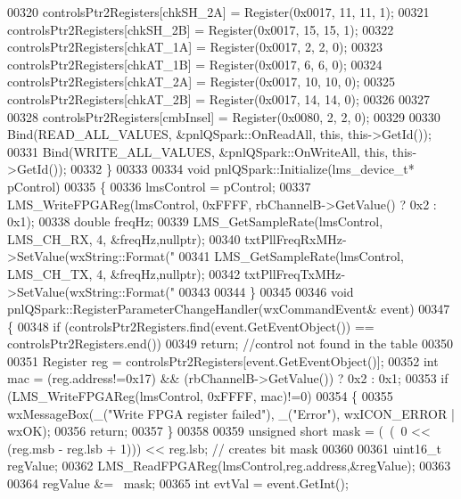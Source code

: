\begin{DoxyCode}
00320     controlsPtr2Registers[chkSH_2A] = Register(0x0017, 11, 11, 1);
00321     controlsPtr2Registers[chkSH_2B] = Register(0x0017, 15, 15, 1);
00322     controlsPtr2Registers[chkAT_1A] = Register(0x0017, 2, 2, 0);
00323     controlsPtr2Registers[chkAT_1B] = Register(0x0017, 6, 6, 0);
00324     controlsPtr2Registers[chkAT_2A] = Register(0x0017, 10, 10, 0);
00325     controlsPtr2Registers[chkAT_2B] = Register(0x0017, 14, 14, 0);
00326 
00327 
00328     controlsPtr2Registers[cmbInsel] = Register(0x0080, 2, 2, 0);
00329     
00330     Bind(READ\_ALL\_VALUES, &pnlQSpark::OnReadAll, \textcolor{keyword}{this}, this->GetId());
00331     Bind(WRITE\_ALL\_VALUES, &pnlQSpark::OnWriteAll, \textcolor{keyword}{this}, this->GetId());
00332 \}
00333 
00334 \textcolor{keywordtype}{void} pnlQSpark::Initialize(lms_device_t* pControl)
00335 \{
00336     lmsControl = pControl;
00337     LMS_WriteFPGAReg(lmsControl, 0xFFFF, rbChannelB->GetValue() ? 0x2 : 0x1);
00338     \textcolor{keywordtype}{double} freqHz;
00339     LMS_GetSampleRate(lmsControl, LMS_CH_RX, 4, &freqHz,\textcolor{keyword}{nullptr});
00340     txtPllFreqRxMHz->SetValue(wxString::Format(\textcolor{stringliteral}{"%
00341     LMS_GetSampleRate(lmsControl, LMS_CH_TX, 4, &freqHz,\textcolor{keyword}{nullptr});
00342     txtPllFreqTxMHz->SetValue(wxString::Format(\textcolor{stringliteral}{"%
00343     
00344 \}
00345 
00346 \textcolor{keywordtype}{void} pnlQSpark::RegisterParameterChangeHandler(wxCommandEvent& event)
00347 \{
00348     \textcolor{keywordflow}{if} (controlsPtr2Registers.find(event.GetEventObject()) == 
      controlsPtr2Registers.end())
00349         \textcolor{keywordflow}{return}; \textcolor{comment}{//control not found in the table}
00350 
00351     Register reg = controlsPtr2Registers[\textcolor{keyword}{event}.GetEventObject()];
00352     \textcolor{keywordtype}{int} mac = (reg.address!=0x17) && (rbChannelB->GetValue()) ? 0x2 : 0x1;
00353     \textcolor{keywordflow}{if} (LMS_WriteFPGAReg(lmsControl, 0xFFFF,  mac)!=0)
00354     \{
00355         wxMessageBox(\_(\textcolor{stringliteral}{"Write FPGA register failed"}), \_(\textcolor{stringliteral}{"Error"}), wxICON\_ERROR | wxOK); 
00356         \textcolor{keywordflow}{return};
00357     \}
00358 
00359     \textcolor{keywordtype}{unsigned} \textcolor{keywordtype}{short} mask = (~(~0 << (reg.msb - reg.lsb + 1))) << reg.lsb; \textcolor{comment}{// creates bit mask}
00360 
00361     uint16\_t regValue;
00362     LMS_ReadFPGAReg(lmsControl,reg.address,&regValue);
00363 
00364     regValue &= ~mask;
00365     \textcolor{keywordtype}{int} evtVal = \textcolor{keyword}{event}.GetInt();
}}
\end{DoxyCode}
